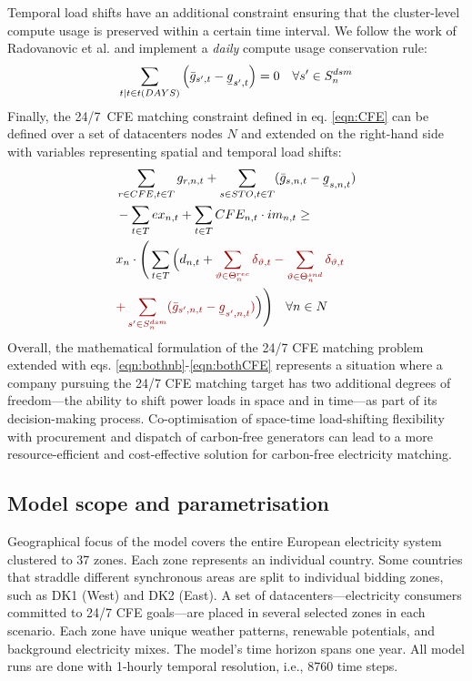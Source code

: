 Temporal load shifts have an additional constraint ensuring that the cluster-level compute usage is preserved within a certain time interval. We follow the work of Radovanovic et al. \cite{radovanovicIEEE2023} and implement a \textit{daily} compute usage conservation rule:
\begin{equation}
    \sum_{t | t \in t(DAYS)} \left(\bar{g}_{s',t} - \ubar{g}_{s',t}\right) = 0 \quad \forall {s'} \in S_n^{dsm}
    \label{eqn:dailyconserv2}
\end{equation}
Finally, the 24/7~CFE matching constraint defined in eq. \ref{eqn:CFE} can be defined over a set of datacenters nodes $N$ and extended on the right-hand side with variables representing spatial and temporal load shifts:
\begin{align}
    &\sum_{r\in CFE, t\in T} g_{r,n,t} + \sum_{s\in STO, t\in T} (\bar{g}_{s,n,t} - \ubar{g}_{s,n,t}) \nonumber \\
    &- \sum_{t\in T} ex_{n,t} + \sum_{t\in T} CFE_{n,t} \cdot im_{n,t} \geq \nonumber \\
    &x_n \cdot
        \Bigg( \sum_{t\in T} \Big( d_{n,t} + \textcolor{darkred}{\sum_{\vartheta \in \Theta_n^{rec}}\delta_{\vartheta, t} - \sum_{\vartheta \in \Theta_n^{snd}}\delta_{\vartheta, t}} \nonumber \\
        & \textcolor{darkred}{+ \sum_{{s'} \in S_n^{dsm}} (\bar{g}_{s',n,t} - \ubar{g}_{s',n,t})}\Big)\Bigg) \quad \forall n \in N\label{eqn:bothCFE}
\end{align}
Overall, the mathematical formulation of the 24/7 CFE matching problem extended with eqs. \ref{eqn:bothnb}-\ref{eqn:bothCFE} represents a situation where a company pursuing the 24/7 CFE matching target has two additional degrees of freedom---the ability to shift power loads in space and in time---as part of its decision-making process. Co-optimisation of space-time load-shifting flexibility with procurement and dispatch of carbon-free generators can lead to a more resource-efficient and cost-effective solution for carbon-free electricity matching.

\subsection{Model scope and parametrisation}

Geographical focus of the model covers the entire European electricity system clustered to 37 zones. Each zone represents an individual country. Some countries that straddle different synchronous areas are split to individual bidding zones, such as DK1 (West) and DK2 (East). A set of datacenters---electricity consumers committed to 24/7 CFE goals---are placed in several selected zones in each scenario. Each zone have unique weather patterns, renewable potentials, and background electricity mixes. The model's time horizon spans one year. All model runs are done with 1-hourly temporal resolution, i.e., 8760 time steps.


